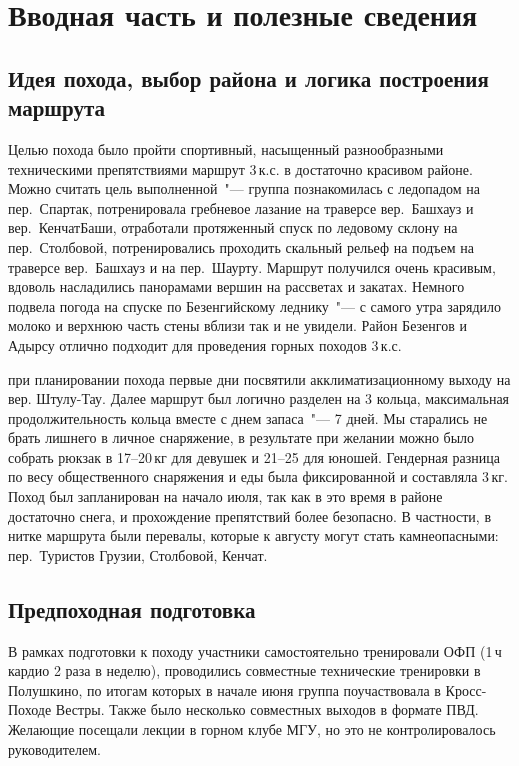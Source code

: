 \section{Вводная часть и полезные сведения}\label{sec:introduction}
	\subsection{Идея похода, выбор района и логика построения маршрута}
		Целью похода было пройти спортивный, насыщенный разнообразными техническими препятствиями маршрут 3\,к.с.
		в достаточно красивом районе. Можно считать цель выполненной~"--- группа познакомилась с ледопадом на
		пер.~Спартак, потренировала гребневое лазание на траверсе вер.~Башхауз и вер.~КенчатБаши, отработали протяженный
		спуск по ледовому склону на пер.~Столбовой, потренировались проходить скальный рельеф на подъем на траверсе
		вер.~Башхауз и на пер.~Шаурту. Маршрут получился очень красивым, вдоволь насладились панорамами вершин на
		рассветах и закатах. Немного подвела погода на спуске по Безенгийскому леднику~"--- с самого утра зарядило молоко
		и верхнюю часть стены вблизи так и не увидели. Район Безенгов и Адырсу отлично подходит для
		проведения горных походов 3\,к.с. 
		
		при планировании похода первые дни посвятили акклиматизационному выходу на вер. Штулу-Тау. Далее маршрут был логично разделен на 3 кольца, максимальная
		продолжительность кольца вместе с днем запаса~"--- 7 дней. Мы старались не брать лишнего в личное снаряжение,
		в результате при желании можно было собрать рюкзак в 17--20\,кг для девушек и 21--25 для юношей. Гендерная разница
		по весу общественного снаряжения и еды была фиксированной и составляла 3\,кг. Поход был запланирован на начало
		июля, так как в это время в районе достаточно снега, и прохождение препятствий более безопасно. В частности, в
		нитке маршрута были перевалы, которые к августу могут стать камнеопасными: пер.~Туристов Грузии, Столбовой, Кенчат.
	
	
	\subsection{Предпоходная подготовка}
		В рамках подготовки к походу участники самостоятельно тренировали ОФП (1\,ч кардио 2 раза в неделю), проводились
		совместные технические тренировки в Полушкино, по итогам которых в начале июня группа поучаствовала в Кросс-Походе
		Вестры. Также было несколько совместных выходов в формате ПВД. Желающие посещали лекции в горном клубе МГУ, но это
		не контролировалось руководителем.
	

